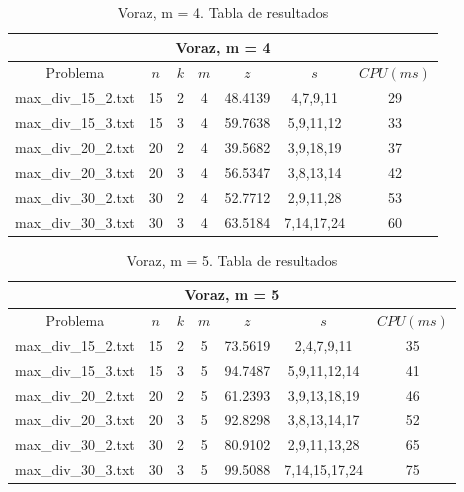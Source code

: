    \begin{table}[h]
   {\small
   \begin{center}
   \begin{tabular}{ccccccc}
      \multicolumn{7}{c}{Voraz, m = 4} \\
      \hline
      Problema & $n$ & $k$ & $m$ & $z$ & $s$ & $CPU(ms)$ \\
      \hline
      max\_div\_15\_2.txt & 15 & 2 & 4 & 48.4139 & 4,7,9,11 & 29 \\
      max\_div\_15\_3.txt & 15 & 3 & 4 & 59.7638 & 5,9,11,12 & 33 \\
      max\_div\_20\_2.txt & 20 & 2 & 4 & 39.5682 & 3,9,18,19 & 37 \\
      max\_div\_20\_3.txt & 20 & 3 & 4 & 56.5347 & 3,8,13,14 & 42 \\
      max\_div\_30\_2.txt & 30 & 2 & 4 & 52.7712 & 2,9,11,28 & 53 \\
      max\_div\_30\_3.txt & 30 & 3 & 4 & 63.5184 & 7,14,17,24 & 60 \\
      \hline
   \end{tabular}
   \end{center}
   }
   \caption{Voraz, m = 4. Tabla de resultados}
   \end{table}

   \begin{table}[h]
   {\small
   \begin{center}
   \begin{tabular}{ccccccc}
      \multicolumn{7}{c}{Voraz, m = 5} \\
      \hline
      Problema & $n$ & $k$ & $m$ & $z$ & $s$ & $CPU(ms)$ \\
      \hline
      max\_div\_15\_2.txt & 15 & 2 & 5 & 73.5619 & 2,4,7,9,11 & 35 \\
      max\_div\_15\_3.txt & 15 & 3 & 5 & 94.7487 & 5,9,11,12,14 & 41 \\
      max\_div\_20\_2.txt & 20 & 2 & 5 & 61.2393 & 3,9,13,18,19 & 46 \\
      max\_div\_20\_3.txt & 20 & 3 & 5 & 92.8298 & 3,8,13,14,17 & 52 \\
      max\_div\_30\_2.txt & 30 & 2 & 5 & 80.9102 & 2,9,11,13,28 & 65 \\
      max\_div\_30\_3.txt & 30 & 3 & 5 & 99.5088 & 7,14,15,17,24 & 75 \\
      \hline
   \end{tabular}
   \end{center}
   }
   \caption{Voraz, m = 5. Tabla de resultados}
   \end{table}


